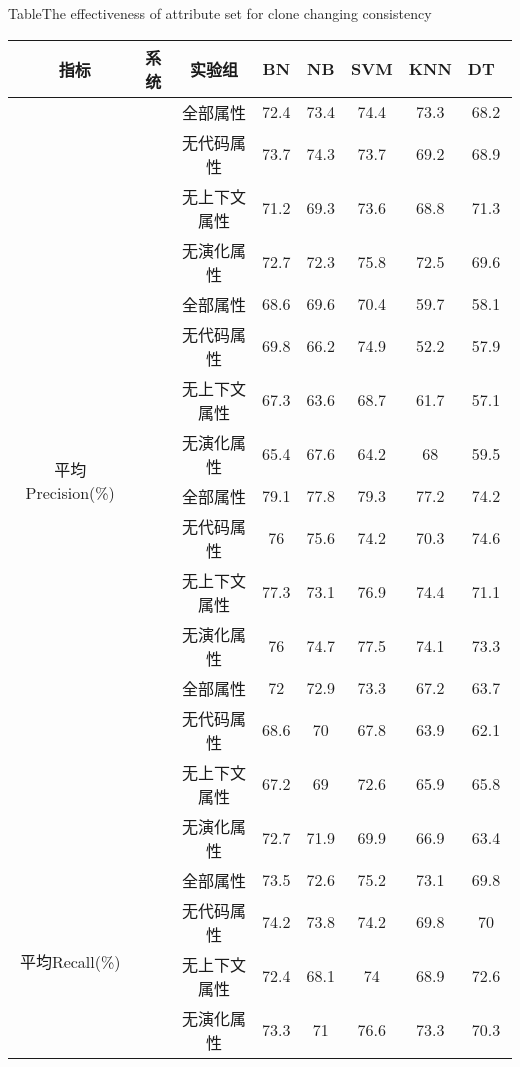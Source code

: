 \begin{table} [htbp]
\renewcommand\arraystretch{0.65} 
{Table$\!$}{The effectiveness of attribute set for clone changing consistency}
\vspace{0.5em}
\centering
\footnotesize
\begin{tabular}{cccccccc}
\toprule[1.5pt]
~{指标}&{系统}&{实验组}&{BN}&{NB}&{SVM}&{KNN}&{DT}~\\
\midrule[1pt]
\multirow{16}{*}{平均Precision(\%)}
&~\multirow{4}{*}{ArgoUML}
&全部属性& 72.4    & 73.4  & 74.4 & 73.3 & 68.2 \\
&&无代码属性 & 73.7    & 74.3  & 73.7 & 69.2 & 68.9 \\
&&无上下文属性  & 71.2    & 69.3  & 73.6 & 68.8 & 71.3 \\
&&无演化属性 & 72.7    & 72.3  & 75.8 & 72.5 & 69.6 \\
\cline{2-8}
&~\multirow{4}{*}{jEdit}
&全部属性& 68.6    & 69.6  & 70.4 & 59.7 & 58.1 \\
&&无代码属性 & 69.8    & 66.2  & 74.9 & 52.2 & 57.9 \\
&&无上下文属性  & 67.3    & 63.6  & 68.7 & 61.7 & 57.1 \\
&&无演化属性& 65.4    & 67.6  & 64.2 & 68  & 59.5 \\
\cline{2-8}
&~\multirow{4}{*}{jFreeChart}
&全部属性  & 79.1    & 77.8  & 79.3 & 77.2 & 74.2 \\
&&无代码属性 & 76     & 75.6  & 74.2 & 70.3 & 74.6 \\
&&无上下文属性  & 77.3    & 73.1  & 76.9 & 74.4 & 71.1 \\
&&无演化属性& 76     & 74.7  & 77.5 & 74.1 & 73.3 \\
\cline{2-8}
&~\multirow{4}{*}{Tuxguitar} 
&全部属性    & 72     & 72.9  & 73.3 & 67.2 & 63.7 \\
&&无代码属性 & 68.6    & 70    & 67.8 & 63.9 & 62.1 \\
&&无上下文属性  & 67.2    & 69   & 72.6 & 65.9 & 65.8 \\
&&无演化属性& 72.7    & 71.9  & 69.9 & 66.9 & 63.4 \\
\hline
\multirow{16}{*}{平均Recall(\%)}&
~\multirow{4}{*}{ArgoUML}
&全部属性   & 73.5    & 72.6  & 75.2 & 73.1 & 69.8 \\
&&无代码属性  & 74.2    & 73.8  & 74.2 & 69.8 & 70   \\
&&无上下文属性  & 72.4    & 68.1  & 74  & 68.9 & 72.6 \\
&&无演化属性& 73.3    & 71   & 76.6 & 73.3 & 70.3 \\

\end{tabular}
\end{table}
